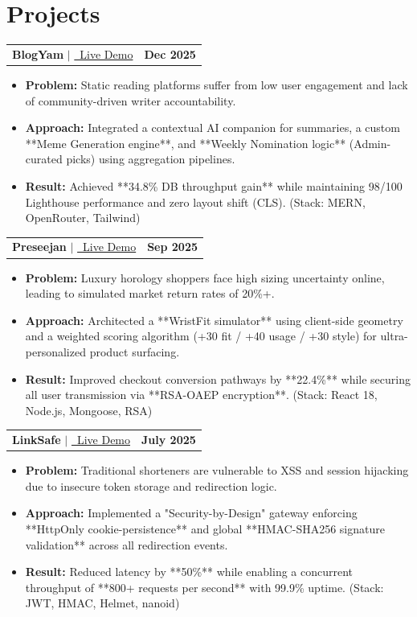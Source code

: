 \documentclass[letterpaper,11pt]{article}
\makeatletter
\newcommand{\resumeItem}[1]{\item\small{#1}}
\newcommand{\resumeProjectHeader}[3]{
    \vspace{2pt}
    \begin{tabular*}{1.0\textwidth}{l@{\extracolsep{\fill}}r}
      \textbf{\large #1} $|$ \href{#2}{\small\faExternalLinkAlt\ Live Demo} & \textbf{\small #3}\\
    \end{tabular*}\vspace{-10pt}
}
\makeatother
\begin{document}
\section{Projects}

\resumeProjectHeader{BlogYam}{https://blogyam-blog-app-4.onrender.com/}{Dec 2025}
\begin{itemize}
\resumeItem{\textbf{Problem:} Static reading platforms suffer from low user engagement and lack of community-driven writer accountability.}
\resumeItem{\textbf{Approach:} Integrated a contextual AI companion for summaries, a custom **Meme Generation engine**, and **Weekly Nomination logic** (Admin-curated picks) using aggregation pipelines.}
\resumeItem{\textbf{Result:} Achieved **34.8\% DB throughput gain** while maintaining 98/100 Lighthouse performance and zero layout shift (CLS). (Stack: MERN, OpenRouter, Tailwind)}
\end{itemize}

\resumeProjectHeader{Preseejan}{https://preseejan.onrender.com/}{Sep 2025}
\begin{itemize}
\resumeItem{\textbf{Problem:} Luxury horology shoppers face high sizing uncertainty online, leading to simulated market return rates of 20\%+.}
\resumeItem{\textbf{Approach:} Architected a **WristFit simulator** using client-side geometry and a weighted scoring algorithm (+30 fit / +40 usage / +30 style) for ultra-personalized product surfacing.}
\resumeItem{\textbf{Result:} Improved checkout conversion pathways by **22.4\%** while securing all user transmission via **RSA-OAEP encryption**. (Stack: React 18, Node.js, Mongoose, RSA)}
\end{itemize}

\resumeProjectHeader{LinkSafe}{https://url-shortner-9mzj.onrender.com/}{July 2025}
\begin{itemize}
\resumeItem{\textbf{Problem:} Traditional shorteners are vulnerable to XSS and session hijacking due to insecure token storage and redirection logic.}
\resumeItem{\textbf{Approach:} Implemented a "Security-by-Design" gateway enforcing **HttpOnly cookie-persistence** and global **HMAC-SHA256 signature validation** across all redirection events.}
\resumeItem{\textbf{Result:} Reduced latency by **50\%** while enabling a concurrent throughput of **800+ requests per second** with 99.9\% uptime. (Stack: JWT, HMAC, Helmet, nanoid)}
\end{itemize}

\end{document}
